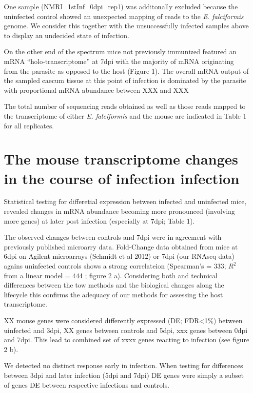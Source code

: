 \documentclass{bmcart}
\begin{document}
One sample (NMRI\_1stInf\_0dpi\_rep1) was additonally excluded because
the uninfected control showed an unexpected mapping of reads to the
\textit{E. falciformis} genome. We consider this together with the
unsuccessfully infected samples above to display an undecided state of
infection.

On the other end of the spectrum mice not previously immunized
featured an mRNA ``holo-transcriptome'' at 7dpi with the majority of
mRNA originating from the parasite as opposed to the host (Figure
1). The overall mRNA output of the sampled caecum tissue at this point
of infection is dominated by the parasite with proportional mRNA
abundance between XXX and XXX %

The total number of sequencing reads obtained as well as those reads
mapped to the transcriptome of either \textit{E. falciformis} and the
mouse are indicated in Table 1 for all replicates.

\section*{The mouse transcriptome changes in the course of infection infection}

Statistical testing for differetial expression between infected and
uninfected mice, revealed changes in mRNA abundance becoming more
pronounced (involving more genes) at later post infection (especially
at 7dpi; Table 1).

The observed changes between controls and 7dpi were in agreement with
previously published microarry data. Fold-Change data obtained from
mice at 6dpi on Agilent microarrays (Schmidt et al 2012) or 7dpi (our
RNAseq data) agains uninfected controls shows a strong correlateion
(Spearman's \rho = 333; $R^2$ from a linear model = 444 ; figure 2
a). Considering both and technical differences between the tow methods
and the biological changes along the lifecycle this confirms the
adequacy of our methods for assessing the host transcriptome.

XX mouse genes were considered differently expressed (DE; FDR<1\%)
between uinfected and 3dpi, XX genes between controls and 5dpi, xxx
genes between 0dpi and 7dpi. This lead to combined set of xxxx genes
reacting to infection (see figure 2 b).


We detected no distinct response early in infection.  When testing for
differences between 3dpi and later infection (5dpi and 7dpi) DE genes
were simply a subset of genes DE between respective infections and
controls.
\end{document}
